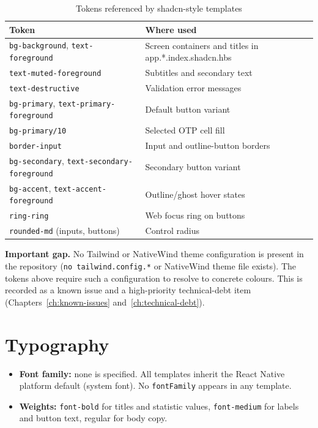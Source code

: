 \begin{table}[H]
\centering
\caption{Tokens referenced by shadcn-style templates}
\begin{tabular}{p{4.4cm}p{9.4cm}}
\toprule
\textbf{Token} & \textbf{Where used} \\
\midrule
\texttt{bg-background}, \texttt{text-foreground} & Screen containers and titles in
\ttfamily app.*.index.shadcn.hbs \\
\texttt{text-muted-foreground} & Subtitles and secondary text \\
\texttt{text-destructive} & Validation error messages \\
\texttt{bg-primary}, \texttt{text-primary-foreground} & Default button variant \\
\texttt{bg-primary/10} & Selected OTP cell fill \\
\texttt{border-input} & Input and outline-button borders \\
\texttt{bg-secondary}, \texttt{text-secondary-foreground} & Secondary button variant \\
\texttt{bg-accent}, \texttt{text-accent-foreground} & Outline/ghost hover states \\
\texttt{ring-ring} & Web focus ring on buttons \\
\texttt{rounded-md} (inputs, buttons) & Control radius \\
\bottomrule
\end{tabular}
\end{table}

\textbf{Important gap.} No Tailwind or NativeWind theme configuration is present in
the repository (\texttt{no tailwind.config.*} or NativeWind theme file exists).
The tokens above require such a configuration to resolve to concrete colours. This
is recorded as a known issue and a high-priority technical-debt item
(Chapters~\ref{ch:known-issues} and~\ref{ch:technical-debt}).

\section{Typography}

\begin{itemize}
  \item \textbf{Font family:} none is specified. All templates inherit the React
        Native platform default (system font). No \texttt{fontFamily} appears in any
        template.
  \item \textbf{Weights:} \texttt{font-bold} for titles and statistic values,
        \texttt{font-medium} for labels and button text, regular for body copy.
\end{itemize}


